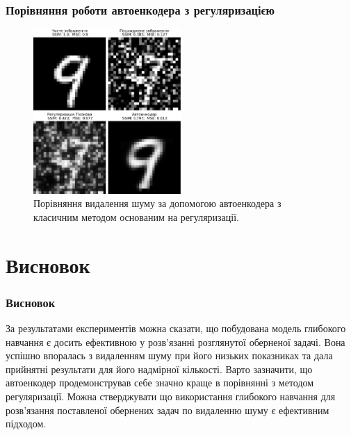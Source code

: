 \documentclass{beamer}
\newcounter{e}
\begin{document}
	\begin{frame}
		\frametitle{Порівняння роботи автоенкодера з регуляризацією}
		\begin{figure}[H]
			\centering
			\includegraphics[width=0.5\textwidth]{../resources/denoising-methods-comparation.pdf}
			\caption{Порівняння видалення шуму за допомогою автоенкодера з класичним методом основаним на регуляризації.}
			\label{fig:denoising-methods-comparation}
		\end{figure}
	\end{frame}
	\section{Висновок}	
	\begin{frame}
		\frametitle{Висновок}
		За результатами експериментів можна сказати, що побудована модель глибокого навчання є досить ефективною у розв'язанні розглянутої оберненої задачі. Вона успішно впоралась з видаленням шуму при його низьких показниках та дала прийнятні результати для його надмірної кількості. Варто зазначити, що автоенкодер продемонстрував себе значно краще в порівнянні з методом регуляризації. Можна стверджувати що використання глибокого навчання для розв'язання поставленої обернених задач по видаленню шуму є ефективним підходом.
	\end{frame}
	\begin{frame}
		\printbibliography[title={Література}]
	\end{frame}
	
	
\end{document}
